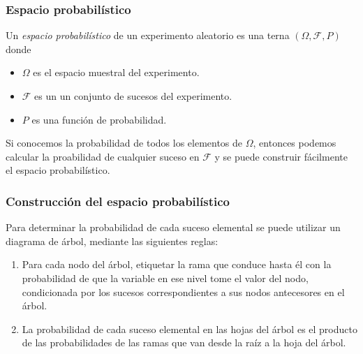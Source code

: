\begin{frame}
\frametitle{Espacio probabilístico}
\begin{definicion}
Un \emph{espacio probabilístico} de un experimento aleatorio es una terna $(\Omega,\mathcal{F},P)$ donde 
\begin{itemize}
	\item $\Omega$ es el espacio muestral del experimento.
	\item $\mathcal{F}$ es un un conjunto de sucesos del experimento.
	\item $P$ es una función de probabilidad.
\end{itemize} 
\end{definicion}

Si conocemos la probabilidad de todos los elementos de $\Omega$, entonces podemos calcular la proabilidad de cualquier suceso en $\mathcal{F}$ y se puede construir fácilmente el espacio probabilístico.
\end{frame}


\begin{frame}
\frametitle{Construcción del espacio probabilístico}
Para determinar la probabilidad de cada suceso elemental se puede utilizar un diagrama de árbol, mediante las siguientes reglas:
\begin{enumerate}
\item Para cada nodo del árbol, etiquetar la rama que conduce hasta él con la probabilidad de que la variable en ese nivel tome el valor del nodo, condicionada por los sucesos correspondientes a sus nodos antecesores en el árbol.
\item La probabilidad de cada suceso elemental en las hojas del árbol es el producto de las probabilidades de las ramas que van desde la raíz a la hoja del árbol.
\end{enumerate}

\begin{center}
\end{center}
\end{frame}



